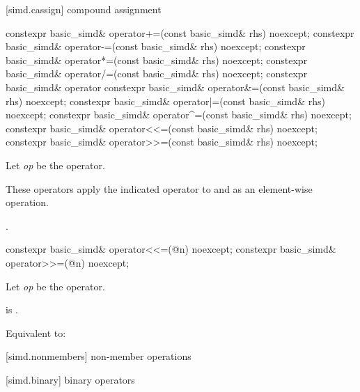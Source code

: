 [simd.cassign]{ compound assignment}

\begin{itemdecl}
constexpr basic_simd& operator+=(const basic_simd& rhs) noexcept;
constexpr basic_simd& operator-=(const basic_simd& rhs) noexcept;
constexpr basic_simd& operator*=(const basic_simd& rhs) noexcept;
constexpr basic_simd& operator/=(const basic_simd& rhs) noexcept;
constexpr basic_simd& operator%
constexpr basic_simd& operator&=(const basic_simd& rhs) noexcept;
constexpr basic_simd& operator|=(const basic_simd& rhs) noexcept;
constexpr basic_simd& operator^=(const basic_simd& rhs) noexcept;
constexpr basic_simd& operator<<=(const basic_simd& rhs) noexcept;
constexpr basic_simd& operator>>=(const basic_simd& rhs) noexcept;
\end{itemdecl}

\begin{itemdescr}
  \pnum Let \textit{op} be the operator.

  \pnum\ConstraintOperatorTWellFormed

  \pnum\effects
  These operators apply the indicated operator to  and  as an element-wise
  operation.

  \pnum\returns
  .
\end{itemdescr}

\begin{itemdecl}
constexpr basic_simd& operator<<=(@\simdsizetype@ n) noexcept;
constexpr basic_simd& operator>>=(@\simdsizetype@ n) noexcept;
\end{itemdecl}

\begin{itemdescr}
  \pnum Let \textit{op} be the operator.

  \pnum\constraints
   is .

  \pnum\effects
  Equivalent to: 
\end{itemdescr}

[simd.nonmembers]{ non-member operations}

[simd.binary]{ binary operators}


